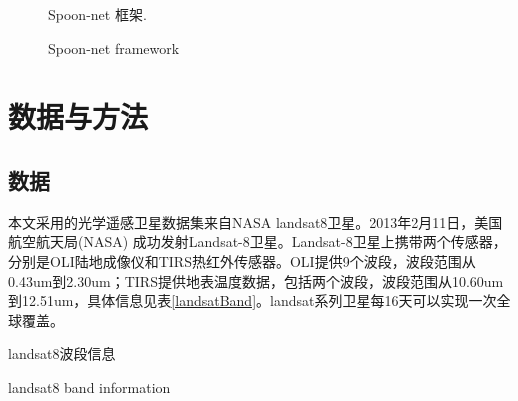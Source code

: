 \documentclass[10pt]{ctexart}
\begin{document}
\begin{multicols}{2}
\begin{figure}[H]
    \centering
    \caption{Spoon-net 框架.}
    \addtocounter{figure}{-1}
    \vspace{-5pt}
    \renewcommand{\figurename}{Fig}
    \caption{Spoon-net framework}
    \renewcommand{\figurename}{图}

    \label{fig:spoon_simple}
\end{figure}

\section[]{数据与方法}
\subsection{数据}
本文采用的光学遥感卫星数据集来自NASA landsat8卫星。2013年2月11日，美国航空航天局(NASA) 成功发射Landsat-8卫星。Landsat-8卫星上携带两个传感器，分别是OLI陆地成像仪和TIRS热红外传感器。OLI提供9个波段，波段范围从0.43um到2.30um；TIRS提供地表温度数据，包括两个波段，波段范围从10.60um到12.51um，具体信息见表\ref{landsatBand}。landsat系列卫星每16天可以实现一次全球覆盖。

\begin{table}[H]
    \caption{landsat8波段信息}
    \addtocounter{table}{-1}
    \vspace{-5pt}
    \renewcommand{\tablename}{Tab}
    \caption{landsat8 band information}
    \renewcommand{\tablename}{表}
    \vspace{5pt}


\end{table}
\end{multicols}
\end{document}
